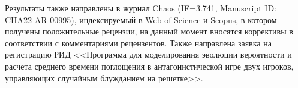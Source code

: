 Результаты также направлены в журнал Chaos (IF=3.741, Manuscript ID: CHA22-AR-00995), индексируемый
в Web of Science и Scopus, в котором получены положительные
рецензии, на данный момент вносятся коррективы в соответствии
с комментариями рецензентов. Также направлена заявка на регистрацию РИД
<<Программа для моделирования эволюции вероятности и 
расчета среднего времени поглощения в антагонистической игре двух игроков, управляющих 
случайным блужданием на решетке>>.


